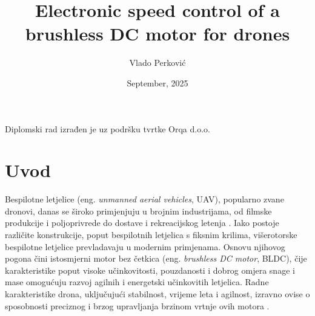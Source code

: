 \documentclass[diplomskirad, upload]{fer}
\title{Electronic speed control of a brushless DC motor for drones}
\author{Vlado Perković}
\date{September, 2025}
\begin{document}
\maketitle




\begin{zahvale}
	Diplomski rad izrađen je uz podršku tvrtke Orqa d.o.o.
\end{zahvale}

\mainmatter

\tableofcontents
\newpage

\chapter{Uvod}
\label{pog:uvod}

Bespilotne letjelice (eng. \textit{unmanned aerial vehicles}, UAV), popularno
zvane dronovi, danas se široko primjenjuju u brojnim industrijama, od filmske
produkcije i poljoprivrede do dostave i rekreacijskog letenja
\cite{cite:primjena}. Iako postoje različite konstrukcije, poput bespilotnih
letjelica s fiksnim krilima, višerotorske bespilotne letjelice prevladavaju u
modernim primjenama. Osnovu njihovog pogona čini istosmjerni motor bez četkica
(eng. \textit{brushless DC motor}, BLDC), čije karakteristike poput visoke
učinkovitosti, pouzdanosti i dobrog omjera snage i mase omogućuju razvoj
agilnih i energetski učinkovitih letjelica. Radne karakteristike drona,
uključujući stabilnost, vrijeme leta i agilnost, izravno ovise o sposobnosti
preciznog i brzog upravljanja brzinom vrtnje ovih motora
\cite{cite:karakteristike_motora}.
\end{document}
